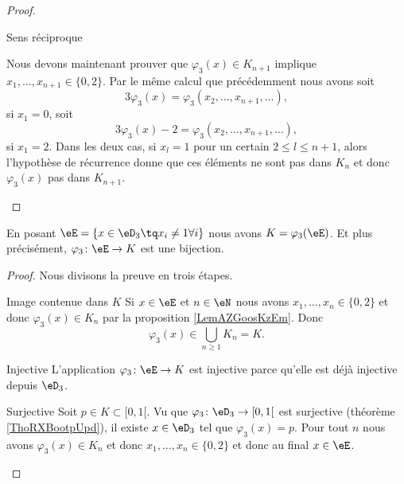 \begin{proof}
\begin{subproof}
        \item[Sens réciproque]
        
            Nous devons maintenant prouver que \( \varphi_3(x)\in K_{n+1}\) implique \( x_1,\ldots, x_{n+1}\in\{ 0,2 \}\). Par le même calcul que précédemment nous avons soit
            \begin{equation}
                3\varphi_3(x)=\varphi_3(x_2,\ldots, x_{n+1},\ldots),
            \end{equation}
            si \( x_1=0\), soit
            \begin{equation}
                3\varphi_3(x)-2=\varphi_3(x_2,\ldots, x_{n+1},\ldots),
            \end{equation}
            si \( x_1=2\). Dans les deux cas, si \( x_l=1\) pour un certain \( 2\leq l\leq n+1\), alors l'hypothèse de récurrence donne que ces éléments ne sont pas dans \( K_n\) et donc \( \varphi_3(x)\) pas dans \( K_{n+1}\).

        \end{subproof}
\end{proof}

\begin{corollary}   \label{CorSEDooJmeXt}
    En posant \( \eE=\{ x\in\eD_3\tq x_i\neq 1\forall i \}\) nous avons \( K=\varphi_3(\eE)\). Et plus précisément, \( \varphi_3\colon \eE\to K\) est une bijection.
\end{corollary}

\begin{proof}
    Nous divisons la preuve en trois étapes.
    \begin{subproof}
    \item[Image contenue dans \( K\)]
        Si \( x\in \eE\) et \( n\in \eN\) nous avons \( x_1,\ldots, x_n\in\{ 0,2 \}\) et donc \( \varphi_3(x)\in K_n\) par la proposition \ref{LemAZGoosKzEm}. Donc
        \begin{equation}
            \varphi_3(x)\in\bigcup_{n\geq 1}K_n=K.
        \end{equation}
    \item[Injective]
        L'application \( \varphi_3\colon \eE\to K\) est injective parce qu'elle est déjà injective depuis \( \eD_3\).
    \item[Surjective]
        Soit \( p\in K\subset\mathopen[ 0 , 1 [\). Vu que \( \varphi_3\colon \eD_3\to \mathopen[ 0 , 1 [\) est surjective (théorème \ref{ThoRXBootpUpd}), il existe \( x\in \eD_3\) tel que \( \varphi_3(x)=p\). Pour tout \( n\) nous avons \( \varphi_3(x)\in K_n\) et donc \( x_1,\ldots, x_n\in\{ 0,2 \}\) et donc au final \( x\in \eE\).
    \end{subproof}
\end{proof}

